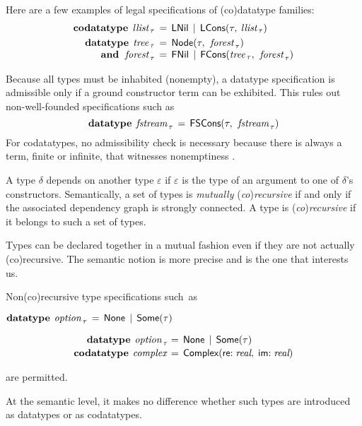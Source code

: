 \begin{rep}%
Here are a few examples of legal specifications of (co)datatype families:
\[\begin{aligned}[t]
      \keyw{codatatype}\; \,\ty{llist}_{\,\tau} & \,=\, \const{LNil} \,\mid\, \const{LCons}(%
      \tau,\: %
      \ty{llist}_{\,\tau}) \\%
      \keyw{datatype}\;\, \ty{tree}_{\,\tau} & \,=\, \const{Node}(\tau,\:\, \ty{forest}_{\,\tau}) \\[-\jot]
      \keyw{and}\;\,\, \ty{forest}_{\,\tau} & \,=\, \const{FNil} \,\mid\, \const{FCons}(\ty{tree}_{\,\tau},\:\, \ty{forest}_{\,\tau})
\end{aligned}
\]

Because all types must be inhabited (nonempty), a datatype specification is
admissible only if a ground constructor term can be exhibited.
This rules out non-well-founded specifications such as
\[\textbf{datatype}\;\, \textit{fstream}_{\,\tau} \,=\, \textsf{FSCons}(\tau,\:\, \textit{fstream}_{\,\tau})\]
For codatatypes, no admissibility check is necessary because there is always a term,
finite or infinite, that witnesses nonemptiness \cite{blanchette-et-al-2015-esop}.
\end{rep}

A type $\delta$ depends on another type $\varepsilon$ if $\varepsilon$ is the
type of an argument to one of $\delta$'s constructors. Semantically, a set of
types is \emph{mutually} (\emph{co})\emph{recursive} if and only if the
associated dependency graph is strongly connected.
A type is (\emph{co})\emph{recursive} if it belongs to such a set of types.
\begin{rep}%
Types can be declared together in a mutual fashion even if they are not actually
(co)recursive. The semantic notion is more precise and is the one that interests
us.
\end{rep}%
%
Non(co)recursive type specifications such~as
\begin{conf}%
\vthinspace $\keyw{datatype}~\vthinspace\ty{option}_{\,\tau} \,=\, \const{None} \,\mid\, \const{Some}(\tau)$
\end{conf}%
\begin{rep}%
\[\begin{aligned}[t]
      \keyw{datatype}~\vthinspace\ty{option}_{\,\tau\!} & \,=\, \const{None} \,\mid\, \const{Some}(\tau) \\[-.5\jot]
      \keyw{codatatype}~\vthinspace\ty{complex} & \,=\, \const{Complex}(\const{re}{:}\; \ty{real},\; \const{im}{:}\;\ty{real})
\end{aligned}
\]
\end{rep}%
are permitted.
\begin{rep}At the semantic level, it makes no difference whether
such types are introduced as datatypes or as codatatypes.
\end{rep}%

